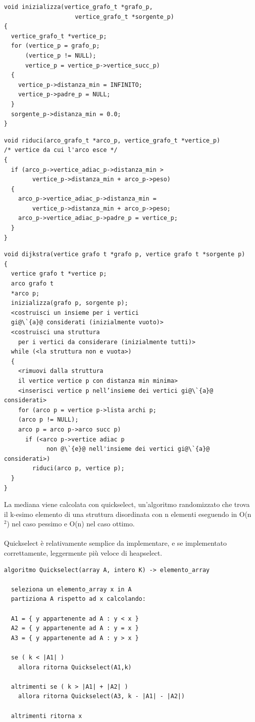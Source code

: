 \documentclass[11pt, a4paper, titlepage, block]{article}
\begin{document}
	\begin{lstlisting}
void inizializza(vertice_grafo_t *grafo_p, 
					vertice_grafo_t *sorgente_p)
{
  vertice_grafo_t *vertice_p;
  for (vertice_p = grafo_p;
 	  (vertice_p != NULL);
	  vertice_p = vertice_p->vertice_succ_p)
  {
    vertice_p->distanza_min = INFINITO;
    vertice_p->padre_p = NULL;
  }
  sorgente_p->distanza_min = 0.0;
}
	\end{lstlisting}
	\newpage
	\begin{lstlisting}
void riduci(arco_grafo_t *arco_p, vertice_grafo_t *vertice_p)
/* vertice da cui l'arco esce */
{
  if (arco_p->vertice_adiac_p->distanza_min > 
  		vertice_p->distanza_min + arco_p->peso)
  {
    arco_p->vertice_adiac_p->distanza_min = 
    	vertice_p->distanza_min + arco_p->peso;
    arco_p->vertice_adiac_p->padre_p = vertice_p;
  }
}
	\end{lstlisting}

	\begin{lstlisting}
void dijkstra(vertice grafo t *grafo p, vertice grafo t *sorgente p)
{
  vertice grafo t *vertice p;
  arco grafo t
  *arco p;
  inizializza(grafo p, sorgente p);
  <costruisci un insieme per i vertici 
  gi@\`{a}@ considerati (inizialmente vuoto)>
  <costruisci una struttura 
  	per i vertici da considerare (inizialmente tutti)>
  while (<la struttura non e vuota>)
  {
    <rimuovi dalla struttura 
    il vertice vertice p con distanza min minima>
    <inserisci vertice p nell’insieme dei vertici gi@\`{a}@ considerati>
    for (arco p = vertice p->lista archi p;
    (arco p != NULL);
    arco p = arco p->arco succ p)
      if (<arco p->vertice adiac p 
      		non @\`{e}@ nell'insieme dei vertici gi@\`{a}@ considerati>)
        riduci(arco p, vertice p);
  }
}
\end{lstlisting}
\newpage
	La mediana viene calcolata con quickselect, un'algoritmo randomizzato che trova il k-esimo elemento di una struttura disordinata con n elementi eseguendo in O(n$^2$) nel caso pessimo e O(n) nel caso ottimo.\\\\

	Quickselect \`{e} relativamente semplice da implementare, e se implementato correttamente, leggermente pi\`{u} veloce di heapselect.\\
	\begin{lstlisting}
algoritmo Quickselect(array A, intero K) -> elemento_array

  seleziona un elemento_array x in A
  partiziona A rispetto ad x calcolando:

  A1 = { y appartenente ad A : y < x } 
  A2 = { y appartenente ad A : y = x }
  A3 = { y appartenente ad A : y > x }

  se ( k < |A1| ) 
  	allora ritorna Quickselect(A1,k)

  altrimenti se ( k > |A1| + |A2| ) 
  	allora ritorna Quickselect(A3, k - |A1| - |A2|)

  altrimenti ritorna x
	\end{lstlisting}
	\newpage
\end{document}
